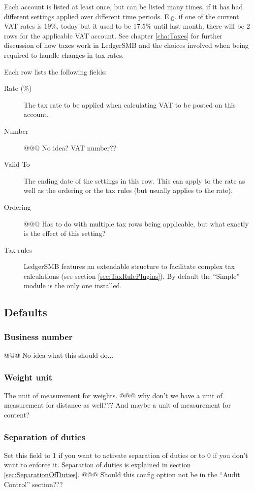 \documentclass[10pt,A4]{book}
\begin{document}
Each account is listed at least once, but can be listed many times, if it has had different
settings applied over different time periods. E.g. if one of the current VAT rates is 19\%,
today but it used to be 17.5\% until last month, there will be 2 rows for the applicable
VAT account. See chapter \ref{cha:Taxes} for further discussion of how taxes work in
LedgerSMB and the choices involved when being required to handle changes in tax rates.

Each row lists the following fields:

\begin{description}
\item [Rate (\%)] The tax rate to be applied when calculating VAT to be posted on this account.
\item [Number] @@@ No idea? VAT number??
\item [Valid To] The ending date of the settings in this row. This can apply to the rate as well as the ordering or the tax rules (but usually applies to the rate).
\item [Ordering] @@@ Has to do with multiple tax rows being applicable, but what exactly is the effect of this setting?
\item [Tax rules] LedgerSMB features an extendable structure to facilitate complex tax
calculations (see section \ref{sec:TaxRulePlugins}). By default the ``Simple'' module
is the only one installed.
\end{description}

\subsection{Defaults}

\subsubsection{Business number}
   @@@ No idea what this should do...
   
\subsubsection{Weight unit}
   The unit of measurement for weights. @@@ why don't we have a unit of measurement for distance as well??? And maybe a unit of measurement for content?
   
\subsubsection{Separation of duties}
   Set this field to 1 if you want to activate separation of duties or to 0 if you don't
   want to enforce it. Separation of duties is explained in section \ref{sec:SeparationOfDuties}. @@@ Should this config option not be in the ``Audit Control'' section???
\end{document}
